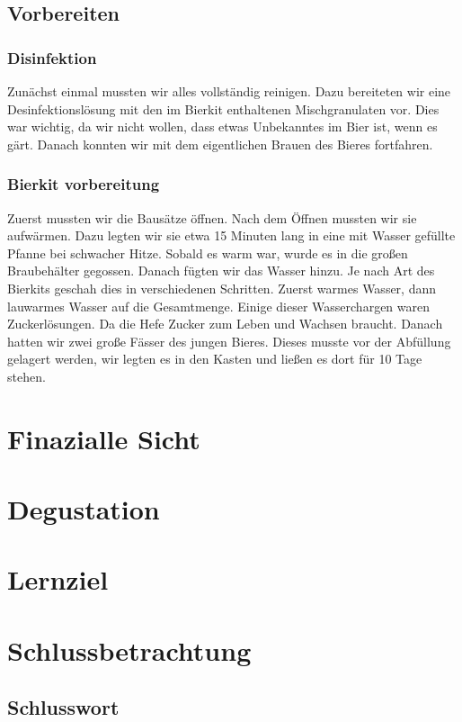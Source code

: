 \documentclass[12pt]{scrartcl}
\begin{document}
\subsection{Vorbereiten}
\subsubsection{Disinfektion}
Zunächst einmal mussten wir alles vollständig reinigen.
Dazu bereiteten wir eine Desinfektionslösung mit den im Bierkit enthaltenen Mischgranulaten vor.
Dies war wichtig, da wir nicht wollen, dass etwas Unbekanntes im Bier ist, wenn es gärt.
Danach konnten wir mit dem eigentlichen Brauen des Bieres fortfahren.
\subsubsection{Bierkit vorbereitung}
Zuerst mussten wir die Bausätze öffnen. Nach dem Öffnen mussten wir sie aufwärmen. Dazu legten wir 
sie etwa 15 Minuten lang in eine mit Wasser gefüllte Pfanne bei schwacher Hitze. Sobald es warm war,
wurde es in die großen Braubehälter gegossen. Danach fügten wir das Wasser hinzu. Je nach Art des Bierkits
 geschah dies in verschiedenen Schritten. Zuerst warmes Wasser, dann lauwarmes Wasser auf die Gesamtmenge.
Einige dieser Wasserchargen waren Zuckerlösungen. Da die Hefe Zucker zum Leben und Wachsen braucht.
Danach hatten wir zwei große Fässer des jungen Bieres.
Dieses musste vor der Abfüllung gelagert werden, wir legten es in den Kasten und ließen es dort für 10 Tage stehen.

\section{Finazialle Sicht}
\section{Degustation}


\section{Lernziel}

\section{Schlussbetrachtung}
\subsection{Schlusswort}
\end{document}

